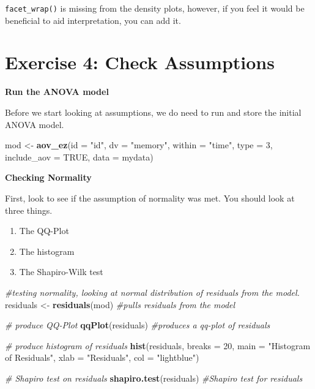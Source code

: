 \documentclass[
]{book}
\newenvironment{Shaded}{\begin{snugshade}}{\end{snugshade}}
\newcommand{\AttributeTok}[1]{\textcolor[rgb]{0.13,0.29,0.53}{#1}}
\newcommand{\CommentTok}[1]{\textcolor[rgb]{0.56,0.35,0.01}{\textit{#1}}}
\newcommand{\ConstantTok}[1]{\textcolor[rgb]{0.56,0.35,0.01}{#1}}
\newcommand{\DecValTok}[1]{\textcolor[rgb]{0.00,0.00,0.81}{#1}}
\newcommand{\FunctionTok}[1]{\textcolor[rgb]{0.13,0.29,0.53}{\textbf{#1}}}
\newcommand{\NormalTok}[1]{#1}
\newcommand{\OtherTok}[1]{\textcolor[rgb]{0.56,0.35,0.01}{#1}}
\newcommand{\StringTok}[1]{\textcolor[rgb]{0.31,0.60,0.02}{#1}}
\providecommand{\tightlist}{%
  \setlength{\itemsep}{0pt}\setlength{\parskip}{0pt}}
\let\oldsection\section
\renewcommand{\section}{\needspace{5\baselineskip}\oldsection}
\begin{document}
\texttt{facet\_wrap()} is missing from the density plots, however, if you feel it would be beneficial to aid interpretation, you can add it.

\section{Exercise 4: Check Assumptions}\label{exercise-4-check-assumptions}

\textbf{Run the ANOVA model}

Before we start looking at assumptions, we do need to run and store the initial ANOVA model.

\begin{Shaded}
\begin{Highlighting}[]
\NormalTok{mod }\OtherTok{\textless{}{-}} \FunctionTok{aov\_ez}\NormalTok{(}\AttributeTok{id =} \StringTok{"id"}\NormalTok{,}
                       \AttributeTok{dv =} \StringTok{"memory"}\NormalTok{,}
                       \AttributeTok{within =} \StringTok{"time"}\NormalTok{,}
                       \AttributeTok{type =} \DecValTok{3}\NormalTok{,}
                       \AttributeTok{include\_aov =} \ConstantTok{TRUE}\NormalTok{,}
                       \AttributeTok{data =}\NormalTok{ mydata)}
\end{Highlighting}
\end{Shaded}

\textbf{Checking Normality}

First, look to see if the assumption of normality was met. You should look at three things.

\begin{enumerate}
\def\labelenumi{\arabic{enumi})}
\tightlist
\item
  The QQ-Plot
\item
  The histogram
\item
  The Shapiro-Wilk test
\end{enumerate}

\begin{Shaded}
\begin{Highlighting}[]
\CommentTok{\#testing normality, looking at normal distribution of residuals from the model.}
\NormalTok{residuals }\OtherTok{\textless{}{-}} \FunctionTok{residuals}\NormalTok{(mod) }\CommentTok{\#pulls residuals from the model}

\CommentTok{\# produce QQ{-}Plot}
\FunctionTok{qqPlot}\NormalTok{(residuals) }\CommentTok{\#produces a qq{-}plot of residuals}

\CommentTok{\# produce histogram of residuals}
\FunctionTok{hist}\NormalTok{(residuals, }\AttributeTok{breaks =} \DecValTok{20}\NormalTok{, }\AttributeTok{main =} \StringTok{"Histogram of Residuals"}\NormalTok{, }\AttributeTok{xlab =} \StringTok{"Residuals"}\NormalTok{, }\AttributeTok{col =} \StringTok{"lightblue"}\NormalTok{) }

\CommentTok{\# Shapiro test on residuals}
\FunctionTok{shapiro.test}\NormalTok{(residuals) }\CommentTok{\#Shapiro test for residuals}
\end{Highlighting}
\end{Shaded}
\end{document}
